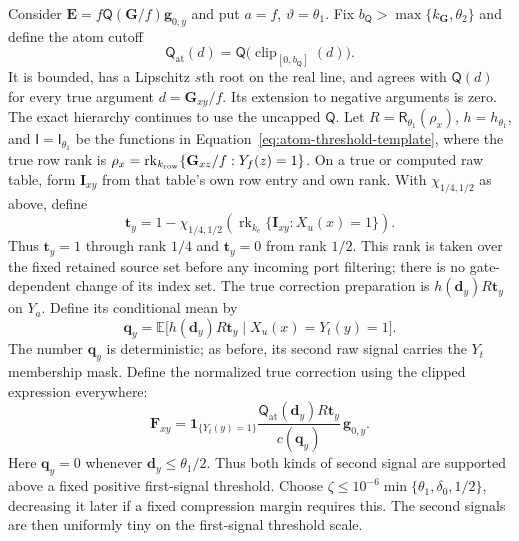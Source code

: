 \documentclass[11pt]{article}
\numberwithin{equation}{section}
\theoremstyle{definition}
\theoremstyle{remark}
\begin{document}
Consider ${\mathbf{E}}=f{\mathsf{Q}}({\mathbf{G}}/f){\mathbf{g}}_{0,y}$ and put $a=f$, $\vartheta=\theta_1$.
Fix ${b}_{\mathsf{Q}}>\max\{{k}_{\mathbf{G}},\theta_2\}$ and define the atom cutoff
\[
 {\mathsf{Q}}_{\mathrm{at}}(d)={\mathsf{Q}}\bigl(\operatorname{clip}_{[0,{b}_{\mathsf{Q}}]}(d)\bigr).
\]
It is bounded, has a Lipschitz $s$th root on the real line, and agrees
with ${\mathsf{Q}}(d)$ for every true argument $d={\mathbf{G}}_{xy}/f$.  Its extension to
negative arguments is zero.  The exact hierarchy continues to use the
uncapped ${\mathsf{Q}}$.  Let $R={\mathsf{R}}_{\theta_1}(\rho_x)$, $h=h_{\theta_1}$, and
${\mathsf{I}}={\mathsf{I}}_{\theta_1}$ be the functions in
Equation~\eqref{eq:atom-threshold-template}, where the true row rank is
$\rho_x=\operatorname{rk}_{k_{\rm row}}\{{\mathbf{G}}_{xz}/f:Y_f(z)=1\}$.
On a true or computed raw table, form ${\mathbf{I}}_{xy}$ from that table's own row
entry and own rank.
With $\chi_{1/4,1/2}$ as above, define
\begin{equation}
 {\mathbf{t}}_y=1-\chi_{1/4,1/2}\left(
       \operatorname{rk}_{{k}_c}\{{\mathbf{I}}_{xy}:X_u(x)=1\}\right).
 \label{eq:atom-incoming-gate}
\end{equation}
Thus ${\mathbf{t}}_y=1$ through rank $1/4$ and ${\mathbf{t}}_y=0$ from rank $1/2$.
This rank is taken over the fixed retained source set before any incoming
port filtering; there is no gate-dependent change of its index set.
The true correction preparation is $h({\mathbf{d}}_y)R {\mathbf{t}}_y$ on $Y_a$.
Define its conditional mean by
\begin{equation}
 {\mathbf{q}}_y=\mathbb E\bigl[h({\mathbf{d}}_y)R {\mathbf{t}}_y\mid X_u(x)=Y_t(y)=1\bigr].
 \label{eq:atom-correction-denominator}
\end{equation}
The number ${\mathbf{q}}_y$ is deterministic; as before, its second raw signal
carries the $Y_t$ membership mask.  Define the normalized true correction
using the clipped expression everywhere:
\begin{equation}
 {\mathbf{F}}_{xy}=\mathbf1_{\{Y_t(y)=1\}}
     \frac{{\mathsf{Q}}_{\mathrm{at}}({\mathbf{d}}_y)R {\mathbf{t}}_y}{c({\mathbf{q}}_y)}\,{\mathbf{g}}_{0,y}.
 \label{eq:atom-correction-table}
\end{equation}
Here ${\mathbf{q}}_y=0$ whenever ${\mathbf{d}}_y\le\theta_1/2$.  Thus both kinds of second
signal are supported above a fixed positive first-signal threshold.
Choose $\zeta\le10^{-6}\min\{\theta_1,\delta_0,1/2\}$, decreasing it
later if a fixed compression margin requires this.  The second signals
are then uniformly tiny on the first-signal threshold scale.
\end{document}
